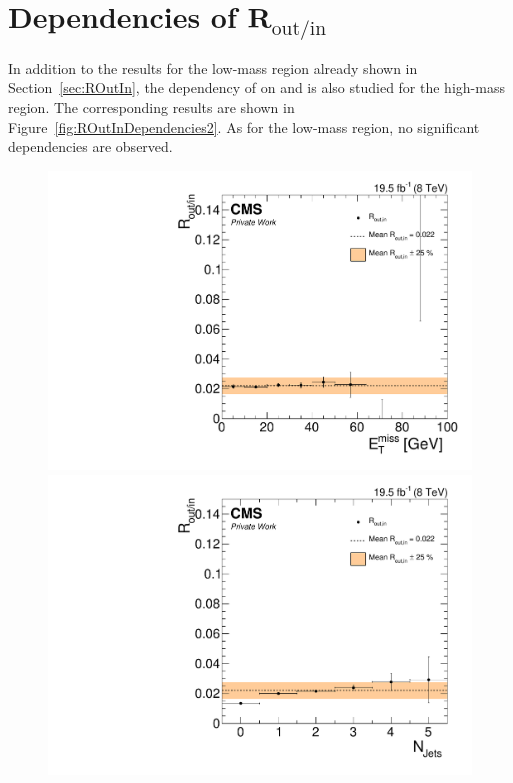\chapter{Dependencies of $\mathbf{R}_{\text{out/in}}$}
In addition to the results for the low-mass region already shown in Section~\ref{sec:ROutIn}, the dependency of \Routin on \MET and \njets is also studied for the high-mass region. The corresponding results are shown in Figure~\ref{fig:ROutInDependencies2}. As for the low-mass region, no significant dependencies are observed.
\label{app:routin}

\begin{figure}[htbp]
\centering
\begin{minipage}[t]{0.49\textwidth}
  \includegraphics[width=\textwidth]{plots/BG/rOutIn/rOutInSyst_DrellYanControlCentral_Full2012_MET_HighMass_SF_None.pdf}
\end{minipage}
\begin{minipage}[t]{0.49\textwidth}
\includegraphics[width=\textwidth]{plots/BG/rOutIn/rOutInSyst_DrellYanControlCentral_Full2012_NJets_HighMass_SF_None.pdf}

\end{minipage}
\end{figure}

